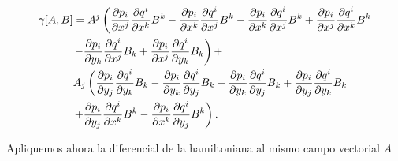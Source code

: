 \documentclass[a4paper,10pt]{article}
\numberwithin{equation}{section}
\newcommand{\zerodel}{.\kern-\nulldelimiterspace}
\begin{document}
\begin{align}
\begin{split}
 \gamma[A,B] &= A^j\left(\frac{\partial p_i}{\partial x^j}\frac{\partial q^i}{\partial x^k}B^k
 - \frac{\partial p_i}{\partial x^k}\frac{\partial q^i}{\partial x^j}B^k
 - \frac{\partial p_i}{\partial x^k}\frac{\partial q^i}{\partial x^j}B^k
 + \frac{\partial p_i}{\partial x^j}\frac{\partial q^i}{\partial x^k}B^k\right\zerodel \\
 &\left\zerodel-\frac{\partial p_i}{\partial y_k}\frac{\partial q^i}{\partial x^j}B_k
 +\frac{\partial p_i}{\partial x^j}\frac{\partial q^i}{\partial y_k}B_k\right) + \\
 &A_j\left( \frac{\partial p_i}{\partial y_j}\frac{\partial q^i}{\partial y_k}B_k - 
  \frac{\partial p_i}{\partial y_k}\frac{\partial q^i}{\partial y_j}B_k
  - \frac{\partial p_i}{\partial y_k}\frac{\partial q^i}{\partial y_j}B_k 
  +\frac{\partial p_i}{\partial y_j}\frac{\partial q^i}{\partial y_k}B_k \right\zerodel \\
  &\left\zerodel + \frac{\partial p_i}{\partial y_j}\frac{\partial q^i}{\partial x^k}B^k
  - \frac{\partial p_i}{\partial x^k}\frac{\partial q^i}{\partial y_j}B^k\right).
  \label{eq:Hamilton1}
\end{split}
\end{align}

Apliquemos ahora la diferencial de la hamiltoniana al mismo campo vectorial $A$

% 
% 
\end{document}
